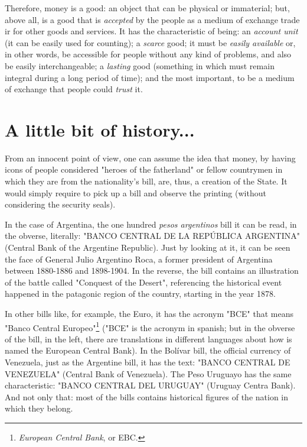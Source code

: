 \documentclass[12pt,a4paper,twoside]{book}
\begin{document}
Therefore, money is a good: an object that can be physical or immaterial; but, above all, is a good that is \textit{accepted} by the people as a medium of exchange trade ir for other goods and services. It has the characteristic of being: an \textit{account unit} (it can be easily used for counting); a \textit{scarce} good; it must be \textit{easily available} or, in other words, be accessible for people without any kind of problems, and also be easily interchangeable; a \textit{lasting} good (something in which must remain integral during a long period of time); and the most important, to be a medium of exchange that people could \textit{trust} it.

\section{A little bit of history...}
From an innocent point of view, one can assume the idea that money, by having icons of people considered "heroes of the fatherland" or fellow countrymen in which they are from the nationality's bill, are, thus, a creation of the State. It would simply require to pick up a bill and observe the printing (without considering the security seals).

In the case of Argentina, the one hundred \textit{pesos argentinos} bill it can be read, in the obverse, literally: "BANCO CENTRAL DE LA REPÚBLICA ARGENTINA" (Central Bank of the Argentine Republic). Just by looking at it, it can be seen the face of General Julio Argentino Roca, a former president of Argentina between 1880-1886 and 1898-1904. In the reverse, the bill contains an illustration of the battle called "Conquest of the Desert", referencing the historical event happened in the patagonic region of the country, starting in the year 1878.

In other bills like, for example, the Euro, it has the acronym "BCE" that means "Banco Central Europeo"\footnote{\textit{European Central Bank}, or EBC.} ("BCE" is the acronym in spanish; but in the obverse of the bill, in the left, there are translations in different languages about how is named the European Central Bank). In the Bolívar bill, the official currency of Venezuela, just as the Argentine bill, it has the text: "BANCO CENTRAL DE VENEZUELA" (Central Bank of Venezuela). The Peso Uruguayo has the same characteristic: "BANCO CENTRAL DEL URUGUAY" (Uruguay Centra Bank). And not only that: most of the bills contains historical figures of the nation in which they belong.
\end{document}
